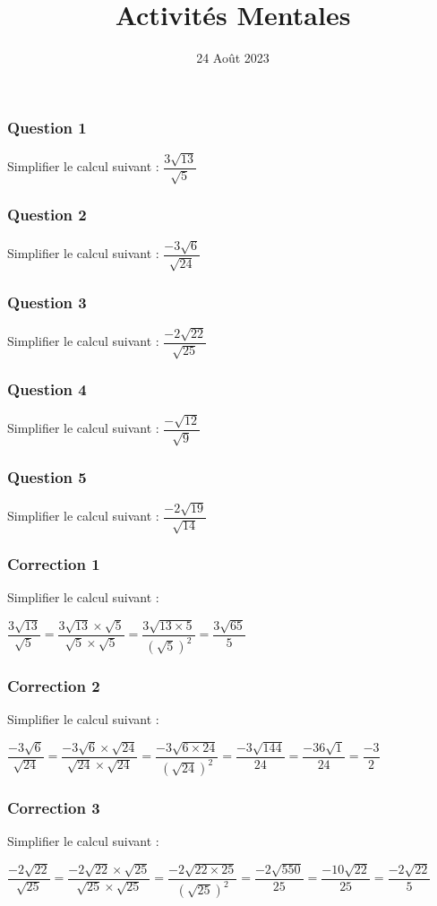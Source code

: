 \documentclass[15pt, mathserif]{beamer}
\title{Activités Mentales}
\date{24 Août 2023}
\begin{document}
\begin{frame}
    \titlepage
\end{frame}

\begin{frame} 
	\frametitle{Question 1}
Simplifier le calcul suivant : $\dfrac{3\sqrt{13}}{\sqrt{5}} $\end{frame}


\begin{frame} 
	\frametitle{Question 2}
Simplifier le calcul suivant : $\dfrac{-3\sqrt{6}}{\sqrt{24}} $\end{frame}


\begin{frame} 
	\frametitle{Question 3}
Simplifier le calcul suivant : $\dfrac{-2\sqrt{22}}{\sqrt{25}} $\end{frame}


\begin{frame} 
	\frametitle{Question 4}
Simplifier le calcul suivant : $\dfrac{-\sqrt{12}}{\sqrt{9}} $\end{frame}


\begin{frame} 
	\frametitle{Question 5}
Simplifier le calcul suivant : $\dfrac{-2\sqrt{19}}{\sqrt{14}} $\end{frame}


\begin{frame}
\vspace{-10mm}
	\frametitle{Correction 1}
Simplifier le calcul suivant : 
 
 $\dfrac{3\sqrt{13}}{\sqrt{5}} = \dfrac{3\sqrt{13} \times \sqrt{5}}{\sqrt{5} \times \sqrt{5}}= \dfrac{3\sqrt{13\times 5}}{(\sqrt{5})^2} = \dfrac{3\sqrt{65}}{5}$ 
 
 \end{frame}


\begin{frame}
\vspace{-10mm}
	\frametitle{Correction 2}
Simplifier le calcul suivant : 
 
 $\dfrac{-3\sqrt{6}}{\sqrt{24}} = \dfrac{-3\sqrt{6} \times \sqrt{24}}{\sqrt{24} \times \sqrt{24}}= \dfrac{-3\sqrt{6\times 24}}{(\sqrt{24})^2} = \dfrac{-3\sqrt{144}}{24} = \dfrac{-36\sqrt{1}}{24}=\dfrac{-3}{2}$ 
 
 \end{frame}


\begin{frame}
\vspace{-10mm}
	\frametitle{Correction 3}
Simplifier le calcul suivant : 
 
 $\dfrac{-2\sqrt{22}}{\sqrt{25}} = \dfrac{-2\sqrt{22} \times \sqrt{25}}{\sqrt{25} \times \sqrt{25}}= \dfrac{-2\sqrt{22\times 25}}{(\sqrt{25})^2} = \dfrac{-2\sqrt{550}}{25} = \dfrac{-10\sqrt{22}}{25}=\dfrac{-2\sqrt{22}}{5}$ 
 
 \end{frame}
\end{document}
